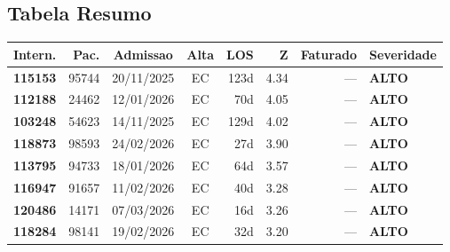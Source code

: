 \documentclass[a4paper,10pt]{article}
\begin{document}
\subsection{Tabela Resumo}
\begin{center}
\begin{longtable}{>{\scriptsize}r>{\scriptsize}r>{\scriptsize}c>{\scriptsize}c>{\scriptsize}r>{\scriptsize}r>{\scriptsize}r>{\scriptsize}l}
\toprule
\textbf{Intern.} & \textbf{Pac.} & \textbf{Admissao} & \textbf{Alta} & \textbf{LOS} & \textbf{Z} & \textbf{Faturado} & \textbf{Severidade} \\
\midrule
\endhead
\bottomrule
\endfoot

\textcolor{anomorange}{\textbf{115153}} & 95744 & 20/11/2025 & \textcolor{anomorange}{EC} & 123d & \textcolor{anomorange}{4.34} & --- & \textcolor{anomorange}{\textbf{ALTO}} \\

\textcolor{anomorange}{\textbf{112188}} & 24462 & 12/01/2026 & \textcolor{anomorange}{EC} & 70d & \textcolor{anomorange}{4.05} & --- & \textcolor{anomorange}{\textbf{ALTO}} \\

\textcolor{anomorange}{\textbf{103248}} & 54623 & 14/11/2025 & \textcolor{anomorange}{EC} & 129d & \textcolor{anomorange}{4.02} & --- & \textcolor{anomorange}{\textbf{ALTO}} \\

\textcolor{anomorange}{\textbf{118873}} & 98593 & 24/02/2026 & \textcolor{anomorange}{EC} & 27d & \textcolor{anomorange}{3.90} & --- & \textcolor{anomorange}{\textbf{ALTO}} \\

\textcolor{anomorange}{\textbf{113795}} & 94733 & 18/01/2026 & \textcolor{anomorange}{EC} & 64d & \textcolor{anomorange}{3.57} & --- & \textcolor{anomorange}{\textbf{ALTO}} \\

\textcolor{anomorange}{\textbf{116947}} & 91657 & 11/02/2026 & \textcolor{anomorange}{EC} & 40d & \textcolor{anomorange}{3.28} & --- & \textcolor{anomorange}{\textbf{ALTO}} \\

\textcolor{anomorange}{\textbf{120486}} & 14171 & 07/03/2026 & \textcolor{anomorange}{EC} & 16d & \textcolor{anomorange}{3.26} & --- & \textcolor{anomorange}{\textbf{ALTO}} \\

\textcolor{anomorange}{\textbf{118284}} & 98141 & 19/02/2026 & \textcolor{anomorange}{EC} & 32d & \textcolor{anomorange}{3.20} & --- & \textcolor{anomorange}{\textbf{ALTO}} \\


\end{longtable}
\end{center}
\end{document}
